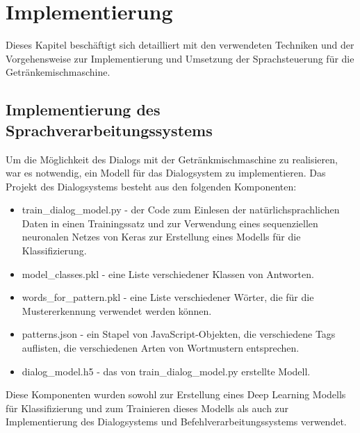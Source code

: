 \chapter{Implementierung}
Dieses Kapitel beschäftigt sich detailliert mit den verwendeten Techniken und der Vorgehensweise zur Implementierung und Umsetzung der Sprachsteuerung für die Getränkemischmaschine.
\section{Implementierung des Sprachverarbeitungssystems}\label{section:Implementierung_Sprachverarbeitung}
Um die Möglichkeit des Dialogs mit der Getränkmischmaschine zu realisieren, war es notwendig, ein Modell für das Dialogsystem zu implementieren. Das Projekt des Dialogsystems besteht aus den folgenden Komponenten:
\begin{itemize}
    \item train\_dialog\_model.py - der Code zum Einlesen der natürlichsprachlichen Daten in einen Trainingssatz und zur Verwendung eines sequenziellen neuronalen Netzes von Keras zur Erstellung eines Modells für die Klassifizierung.
    \item model\_classes.pkl - eine Liste verschiedener Klassen von Antworten.
    \item words\_for\_pattern.pkl - eine Liste verschiedener Wörter, die für die Mustererkennung verwendet werden können.
    \item patterns.json - ein Stapel von JavaScript-Objekten, die verschiedene Tags auflisten, die verschiedenen Arten von Wortmustern entsprechen.
    \item dialog\_model.h5 - das von train\_dialog\_model.py erstellte Modell.
\end{itemize}
Diese Komponenten wurden sowohl zur Erstellung eines Deep Learning Modells für Klassifizierung und zum Trainieren dieses Modells als auch zur Implementierung des Dialogsystems und Befehlverarbeitungssystems verwendet.
